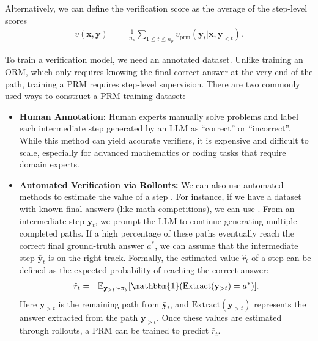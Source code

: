 \noindent Alternatively, we can define the verification score as the average of the step-level scores
\begin{eqnarray}
v(\mathbf{x}, \mathbf{y}) & = & \frac{1}{n_p}\sum_{1 \le t \le n_p} v_{\mathrm{prm}}(\bar{\mathbf{y}}_t | \mathbf{x}, \bar{\mathbf{y}}_{<t}).
\end{eqnarray}

To train a verification model, we need an annotated dataset. Unlike training an ORM, which only requires knowing the final correct answer at the very end of the path, training a PRM requires step-level supervision. There are two commonly used ways to construct a PRM training dataset:

\begin{itemize}
\item \vspace{0.5em} \textbf{Human Annotation:} Human experts manually solve problems and label each intermediate step generated by an LLM as ``correct'' or ``incorrect''. While this method can yield accurate verifiers, it is expensive and difficult to scale, especially for advanced mathematics or coding tasks that require domain experts.
\item \vspace{0.3em} \textbf{Automated Verification via Rollouts:} We can also use automated methods to estimate the value of a step \cite{wang-etal:2024math}. For instance, if we have a dataset with known final answers (like math competitions), we can use . From an intermediate step $\bar{\mathbf{y}}_t$, we prompt the LLM to continue generating multiple completed paths. If a high percentage of these paths eventually reach the correct final ground-truth answer $a^*$, we can assume that the intermediate step $\bar{\mathbf{y}}_t$ is on the right track. Formally, the estimated value $\hat{r}_t$ of a step can be defined as the expected probability of reaching the correct answer:
    \begin{eqnarray}
    \hat{r}_t & = & \mathbb{E}_{\mathbf{y}_{>t} \sim \pi_\theta} [ \mathbbm{1}(\mathrm{Extract}(\mathbf{y}_{>t}) = a^*) ].
    \end{eqnarray}
    \noindent Here $\mathbf{y}_{>t}$ is the remaining path from $\bar{\mathbf{y}}_t$, and $\mathrm{Extract}(\mathbf{y}_{>t})$ represents the answer extracted from the path $\mathbf{y}_{>t}$. Once these values are estimated through rollouts, a PRM can be trained to predict $\hat{r}_t$.
\end{itemize}\vspace{0.5em}


